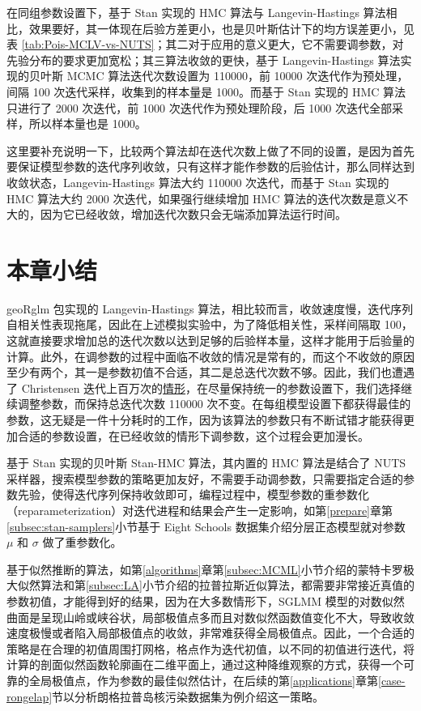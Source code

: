 \documentclass[12pt,a4paper,UTF8,twoside]{book}
\theoremstyle{definition}
\theoremstyle{definition}
\theoremstyle{definition}
\theoremstyle{remark}
\begin{document}
在同组参数设置下，基于 Stan 实现的 HMC 算法与 Langevin-Hastings 算法相比，效果要好，其一体现在后验方差更小，也是贝叶斯估计下的均方误差更小，见表 \ref{tab:Pois-MCLV-vs-NUTS}；其二对于应用的意义更大，它不需要调参数，对先验分布的要求更加宽松；其三算法收敛的更快，基于 Langevin-Hastings 算法实现的贝叶斯 MCMC 算法迭代次数设置为 110000，前 10000 次迭代作为预处理，间隔 100 次迭代采样，收集到的样本量是 1000。而基于 Stan 实现的 HMC 算法只进行了 2000 次迭代，前 1000 次迭代作为预处理阶段，后 1000 次迭代全部采样，所以样本量也是 1000。

这里要补充说明一下，比较两个算法却在迭代次数上做了不同的设置，是因为首先要保证模型参数的迭代序列收敛，只有这样才能作参数的后验估计，那么同样达到收敛状态，Langevin-Hastings 算法大约 110000 次迭代，而基于 Stan 实现的 HMC 算法大约 2000 次迭代，如果强行继续增加 HMC 算法的迭代次数是意义不大的，因为它已经收敛，增加迭代次数只会无端添加算法运行时间。

\hypertarget{sec:simulations}{%
\section{本章小结}\label{sec:simulations}}

geoRglm 包实现的 Langevin-Hastings 算法，相比较而言，收敛速度慢，迭代序列自相关性表现拖尾，因此在上述模拟实验中，为了降低相关性，采样间隔取 100，这就直接要求增加总的迭代次数以达到足够的后验样本量，这样才能用于后验量的计算。此外，在调参数的过程中面临不收敛的情况是常有的，而这个不收敛的原因至少有两个，其一是参数初值不合适，其二是总迭代次数不够。因此，我们也遭遇了 Christensen 迭代上百万次的\href{http://gbi.agrsci.dk/~ofch/geoRglm/Intro/books.html}{情形}，在尽量保持统一的参数设置下，我们选择继续调整参数，而保持总迭代次数 110000 次不变。在每组模型设置下都获得最佳的参数，这无疑是一件十分耗时的工作，因为该算法的参数只有不断试错才能获得更加合适的参数设置，在已经收敛的情形下调参数，这个过程会更加漫长。

基于 Stan 实现的贝叶斯 Stan-HMC 算法，其内置的 HMC 算法是结合了 NUTS 采样器\citep{hoffman2014}，搜索模型参数的策略更加友好，不需要手动调参数，只需要指定合适的参数先验，使得迭代序列保持收敛即可，编程过程中，模型参数的重参数化（reparameterization）对迭代进程和结果会产生一定影响，如第\ref{prepare}章第\ref{subsec:stan-samplers}小节基于 Eight Schools 数据集介绍分层正态模型就对参数 \(\mu\) 和 \(\sigma\) 做了重参数化。

基于似然推断的算法，如第\ref{algorithms}章第\ref{subsec:MCML}小节介绍的蒙特卡罗极大似然算法和第\ref{subsec:LA}小节介绍的拉普拉斯近似算法，都需要非常接近真值的参数初值，才能得到好的结果，因为在大多数情形下，SGLMM 模型的对数似然曲面是呈现山岭或峡谷状，局部极值点多而且对数似然函数值变化不大，导致收敛速度极慢或者陷入局部极值点的收敛，非常难获得全局极值点。因此，一个合适的策略是在合理的初值周围打网格，格点作为迭代初值，以不同的初值进行迭代，将计算的剖面似然函数轮廓画在二维平面上，通过这种降维观察的方式，获得一个可靠的全局极值点，作为参数的最佳似然估计，在后续的第\ref{applications}章第\ref{case-rongelap}节以分析朗格拉普岛核污染数据集为例介绍这一策略。
\end{document}
